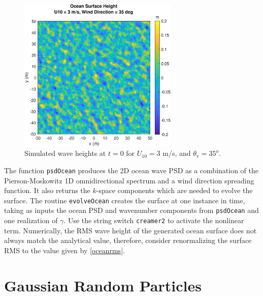 \begin{figure}[htbp] 
   \centering
   \includegraphics[width=3in]{RandomObjects/Figures/oceansurfaceheight} 
   \caption{Simulated wave heights at $t=0$ for $U_{10} = 3$ m/s, and $\theta_{\textrm{v}} = 35^o$.}
   \label{fig:3}
\end{figure}


The function \texttt{psdOcean} produces the 2D ocean wave PSD as a combination of the Pierson-Moskowitz 1D omnidirectional spectrum and a wind direction spreading function. It also returns the $k$-space components which are needed to evolve the surface.  The routine \texttt{evolveOcean} creates the surface at one instance in time, taking as inputs the ocean PSD and wavenumber components from \texttt{psdOcean} and one realization of $\gamma$.  Use the string switch \texttt{creamer2} to activate the nonlinear term. Numerically, the RMS wave height of the generated ocean surface does not always match the analytical value, therefore, consider renormalizing the surface RMS to the value given by \eqref{oceanrms}. 


{\scriptsize
{}
}

{\scriptsize
{}
}


\newpage

\section{Gaussian Random Particles}

